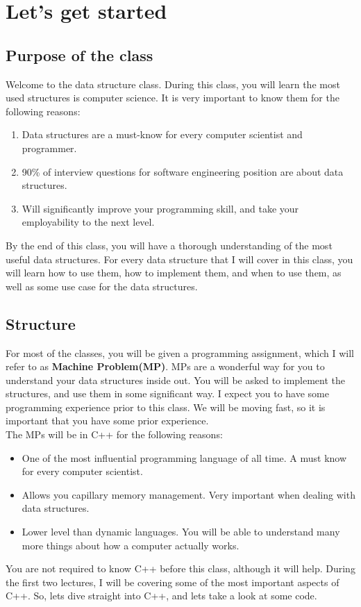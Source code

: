\documentclass[../notebook.tex]{../subfiles/subfiles}
\begin{document}
\begin{center}

\end{center}

\section{ Let's get started }
\subsection{Purpose of the class} %
\label{sec:Purpose of the class}
Welcome to the data structure class. During this class, you will learn the most used structures is computer science. It is very important to know them for the following reasons:
\begin{enumerate}
  \item Data structures are a must-know for every computer scientist and programmer.
  \item 90\% of interview questions for software engineering position are about data structures.
  \item Will significantly improve your programming skill, and take your employability to the next level.
\end{enumerate}
By the end of this class, you will have a thorough understanding of the most useful data structures. For every data structure that I will cover in this class, you will learn how to use them, how to implement them, and when to use them, as well as some use case for the data structures. \\
\subsection{Structure} %
\label{sec:Structure}
For most of the classes, you will be given a programming assignment, which I will refer to as {\bf Machine Problem(MP)}. MPs are a wonderful way for you to understand your data structures inside out. You will be asked to implement the structures, and use them in some significant way. I expect you to have some programming experience prior to this class. We will be moving fast, so it is important that you have some prior experience. \\
The MPs will be in C++ for the following reasons:
\begin{itemize}
  \item One of the most influential programming language of all time. A must know for every computer scientist.
  \item Allows you capillary memory management. Very important when dealing with data structures.
  \item Lower level than dynamic languages. You will be able to understand many more things about how a computer actually works.
\end{itemize}
You are not required to know C++ before this class, although it will help. During the first two lectures, I will be covering some of the most important aspects of C++. So, lets dive straight into C++, and lets take a look at some code.
\end{document}
